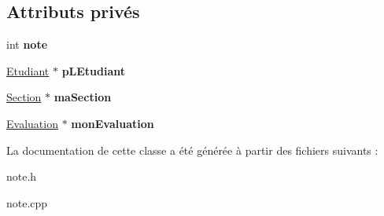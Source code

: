 \subsection*{Attributs privés}
\begin{DoxyCompactItemize}
\item 
\hypertarget{class_note_a3cb5f22dd5374f4e3c59c5f11dc7fbfb}{int {\bfseries note}}\label{class_note_a3cb5f22dd5374f4e3c59c5f11dc7fbfb}

\item 
\hypertarget{class_note_af0bd8055a09d8548b29611ab579419be}{\hyperlink{class_etudiant}{Etudiant} $\ast$ {\bfseries p\+L\+Etudiant}}\label{class_note_af0bd8055a09d8548b29611ab579419be}

\item 
\hypertarget{class_note_a6e57712bda6065467eb09ea96898b428}{\hyperlink{class_section}{Section} $\ast$ {\bfseries ma\+Section}}\label{class_note_a6e57712bda6065467eb09ea96898b428}

\item 
\hypertarget{class_note_a37ac6f84cda46c4c25ea8483836dd2d4}{\hyperlink{class_evaluation}{Evaluation} $\ast$ {\bfseries mon\+Evaluation}}\label{class_note_a37ac6f84cda46c4c25ea8483836dd2d4}

\end{DoxyCompactItemize}


La documentation de cette classe a été générée à partir des fichiers suivants \+:\begin{DoxyCompactItemize}
\item 
note.\+h\item 
note.\+cpp\end{DoxyCompactItemize}
